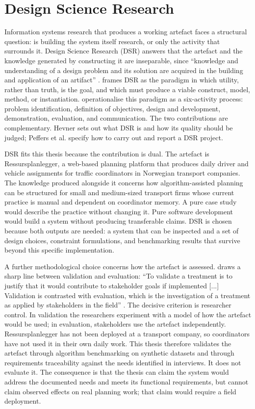 \section{Design Science Research}
\label{sec:design-science-research}

Information systems research that produces a working artefact faces a structural question: is building the system itself research, or only the activity that surrounds it. Design Science Research (DSR) answers that the artefact and the knowledge generated by constructing it are inseparable, since ``knowledge and understanding of a design problem and its solution are acquired in the building and application of an artifact'' \parencite[p.~82]{hevner2004design}. \textcite{hevner2004design} frames DSR as the paradigm in which utility, rather than truth, is the goal, and which must produce a viable construct, model, method, or instantiation. \textcite{peffers2007dsrm} operationalise this paradigm as a six-activity process: problem identification, definition of objectives, design and development, demonstration, evaluation, and communication. The two contributions are complementary. Hevner sets out what DSR is and how its quality should be judged; Peffers et al. specify how to carry out and report a DSR project.

DSR fits this thesis because the contribution is dual. The artefact is Ressursplanlegger, a web-based planning platform that produces daily driver and vehicle assignments for traffic coordinators in Norwegian transport companies. The knowledge produced alongside it concerns how algorithm-assisted planning can be structured for small and medium-sized transport firms whose current practice is manual and dependent on coordinator memory. A pure case study would describe the practice without changing it. Pure software development would build a system without producing transferable claims. DSR is chosen because both outputs are needed: a system that can be inspected and a set of design choices, constraint formulations, and benchmarking results that survive beyond this specific implementation.

A further methodological choice concerns how the artefact is assessed. \textcite{wieringa2014dsm} draws a sharp line between validation and evaluation: ``To validate a treatment is to justify that it would contribute to stakeholder goals if implemented [...] Validation is contrasted with evaluation, which is the investigation of a treatment as applied by stakeholders in the field'' \parencite[p.~31]{wieringa2014dsm}. The decisive criterion is researcher control. In validation the researchers experiment with a model of how the artefact would be used; in evaluation, stakeholders use the artefact independently. Ressursplanlegger has not been deployed at a transport company, so coordinators have not used it in their own daily work. This thesis therefore validates the artefact through algorithm benchmarking on synthetic datasets and through requirements traceability against the needs identified in interviews. It does not evaluate it. The consequence is that the thesis can claim the system would address the documented needs and meets its functional requirements, but cannot claim observed effects on real planning work; that claim would require a field deployment.

